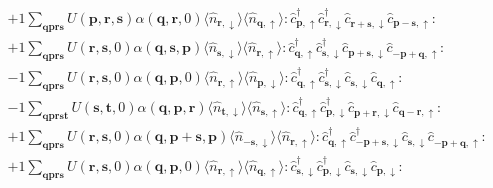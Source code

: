 \begin{align*}
	&+1 \sum_{ \mathbf{q} \mathbf{p} \mathbf{r} \mathbf{s} } U( \mathbf{p}, \mathbf{r}, \mathbf{s} )  \alpha( \mathbf{q}, \mathbf{r}, 0 )   \langle \hat{n}_{ \mathbf{r}, \downarrow } \rangle \langle \hat{n}_{ \mathbf{q}, \uparrow } \rangle :\hat{c}_{ \mathbf{p}, \uparrow }^\dagger \hat{c}_{ \mathbf{r}, \downarrow }^\dagger \hat{c}_{ \mathbf{r}+\mathbf{s}, \downarrow }^{\phantom{\dagger}}\hat{c}_{ \mathbf{p}-\mathbf{s}, \uparrow }^{\phantom{\dagger}}: \\
	&+1 \sum_{ \mathbf{q} \mathbf{p} \mathbf{r} \mathbf{s} } U( \mathbf{r}, \mathbf{s}, 0 )  \alpha( \mathbf{q}, \mathbf{s}, \mathbf{p} )   \langle \hat{n}_{ \mathbf{s}, \downarrow } \rangle \langle \hat{n}_{ \mathbf{r}, \uparrow } \rangle :\hat{c}_{ \mathbf{q}, \uparrow }^\dagger \hat{c}_{ \mathbf{s}, \downarrow }^\dagger \hat{c}_{ \mathbf{p}+\mathbf{s}, \downarrow }^{\phantom{\dagger}}\hat{c}_{ -\mathbf{p}+\mathbf{q}, \uparrow }^{\phantom{\dagger}}: \\
	&-1 \sum_{ \mathbf{q} \mathbf{p} \mathbf{r} \mathbf{s} } U( \mathbf{r}, \mathbf{s}, 0 )  \alpha( \mathbf{q}, \mathbf{p}, 0 )   \langle \hat{n}_{ \mathbf{r}, \uparrow } \rangle \langle \hat{n}_{ \mathbf{p}, \downarrow } \rangle :\hat{c}_{ \mathbf{q}, \uparrow }^\dagger \hat{c}_{ \mathbf{s}, \downarrow }^\dagger \hat{c}_{ \mathbf{s}, \downarrow }^{\phantom{\dagger}}\hat{c}_{ \mathbf{q}, \uparrow }^{\phantom{\dagger}}: \\
	&-1 \sum_{ \mathbf{q} \mathbf{p} \mathbf{r} \mathbf{s} \mathbf{t} } U( \mathbf{s}, \mathbf{t}, 0 )  \alpha( \mathbf{q}, \mathbf{p}, \mathbf{r} )   \langle \hat{n}_{ \mathbf{t}, \downarrow } \rangle \langle \hat{n}_{ \mathbf{s}, \uparrow } \rangle :\hat{c}_{ \mathbf{q}, \uparrow }^\dagger \hat{c}_{ \mathbf{p}, \downarrow }^\dagger \hat{c}_{ \mathbf{p}+\mathbf{r}, \downarrow }^{\phantom{\dagger}}\hat{c}_{ \mathbf{q}-\mathbf{r}, \uparrow }^{\phantom{\dagger}}: \\
	&+1 \sum_{ \mathbf{q} \mathbf{p} \mathbf{r} \mathbf{s} } U( \mathbf{r}, \mathbf{s}, 0 )  \alpha( \mathbf{q}, \mathbf{p}+\mathbf{s}, \mathbf{p} )   \langle \hat{n}_{ -\mathbf{s}, \downarrow } \rangle \langle \hat{n}_{ \mathbf{r}, \uparrow } \rangle :\hat{c}_{ \mathbf{q}, \uparrow }^\dagger \hat{c}_{ -\mathbf{p}+\mathbf{s}, \downarrow }^\dagger \hat{c}_{ \mathbf{s}, \downarrow }^{\phantom{\dagger}}\hat{c}_{ -\mathbf{p}+\mathbf{q}, \uparrow }^{\phantom{\dagger}}: \\
	&+1 \sum_{ \mathbf{q} \mathbf{p} \mathbf{r} \mathbf{s} } U( \mathbf{r}, \mathbf{s}, 0 )  \alpha( \mathbf{q}, \mathbf{p}, 0 )   \langle \hat{n}_{ \mathbf{r}, \uparrow } \rangle \langle \hat{n}_{ \mathbf{q}, \uparrow } \rangle :\hat{c}_{ \mathbf{s}, \downarrow }^\dagger \hat{c}_{ \mathbf{p}, \downarrow }^\dagger \hat{c}_{ \mathbf{s}, \downarrow }^{\phantom{\dagger}}\hat{c}_{ \mathbf{p}, \downarrow }^{\phantom{\dagger}}: \\

\end{align*}

